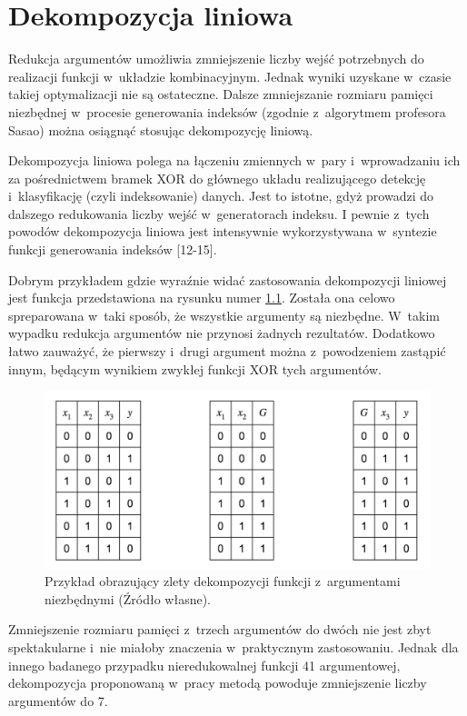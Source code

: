 \chapter{Dekompozycja liniowa}
\label{chapter:decomposition}

Redukcja argumentów umożliwia zmniejszenie liczby wejść potrzebnych do realizacji funkcji w~układzie kombinacyjnym.
Jednak wyniki uzyskane w~czasie takiej optymalizacji nie są ostateczne.
Dalsze zmniejszanie rozmiaru pamięci niezbędnej w~procesie generowania indeksów (zgodnie z~algorytmem profesora Sasao) można osiągnąć stosując dekompozycję liniową.

Dekompozycja liniowa polega na  łączeniu zmiennych w~pary i~wprowadzaniu ich za pośrednictwem bramek XOR do głównego układu realizującego detekcję i~klasyfikację (czyli indeksowanie) danych.
Jest to istotne,
gdyż prowadzi do dalszego redukowania liczby wejść w~generatorach indeksu.
I pewnie z~tych powodów dekompozycja liniowa jest intensywnie wykorzystywana w~syntezie funkcji generowania indeksów [12-15].

Dobrym przykładem gdzie wyraźnie widać zastosowania dekompozycji liniowej jest funkcja przedstawiona na rysunku numer \ref{fig:required-decomposition}.
Została ona celowo spreparowana w~taki sposób,
że wszystkie argumenty są niezbędne.
W~takim wypadku redukcja argumentów nie przynosi żadnych rezultatów.
Dodatkowo łatwo zauważyć,
że pierwszy i~drugi argument można z~powodzeniem zastąpić innym,
będącym wynikiem zwykłej funkcji XOR tych argumentów.

\begin{figure}[H]
\centering
\includegraphics[width = 13cm]{chapter03/required-decomposition.png}
\caption{Przykład obrazujący zlety dekompozycji funkcji z~argumentami niezbędnymi (Źródło własne).}
\label{fig:required-decomposition}
\end{figure}

Zmniejszenie rozmiaru pamięci z~trzech argumentów do dwóch nie jest zbyt spektakularne i~nie miałoby znaczenia w~praktycznym zastosowaniu.
Jednak dla innego badanego przypadku nieredukowalnej funkcji 41 argumentowej,
dekompozycja proponowaną w~pracy metodą powoduje zmniejszenie liczby argumentów do 7.

